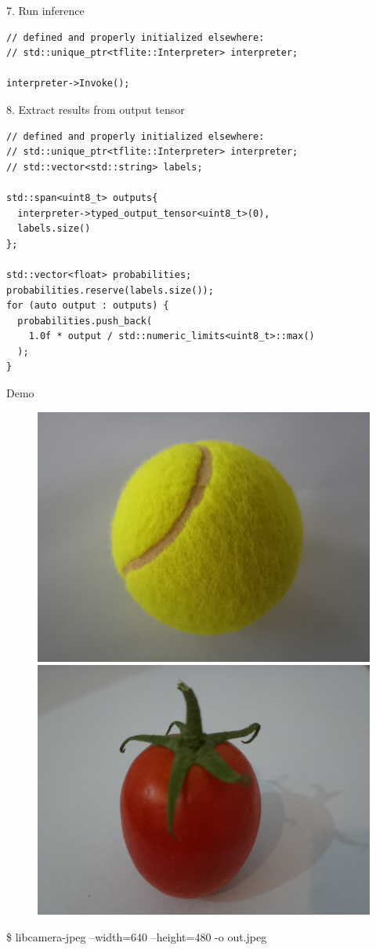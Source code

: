\begin{frame}[fragile]{7. Run inference}
  \lstset{basicstyle=\ttfamily\small, numbers=left, columns=fullflexible}
  \begin{lstlisting}
// defined and properly initialized elsewhere:
// std::unique_ptr<tflite::Interpreter> interpreter;

interpreter->Invoke();
  \end{lstlisting}
\end{frame}

\begin{frame}[fragile]{8. Extract results from output tensor}
  \lstset{basicstyle=\ttfamily\small, numbers=left, columns=fullflexible}
  \begin{lstlisting}
// defined and properly initialized elsewhere:
// std::unique_ptr<tflite::Interpreter> interpreter;
// std::vector<std::string> labels;

std::span<uint8_t> outputs{
  interpreter->typed_output_tensor<uint8_t>(0),
  labels.size()
};

std::vector<float> probabilities;
probabilities.reserve(labels.size());
for (auto output : outputs) {
  probabilities.push_back(
    1.0f * output / std::numeric_limits<uint8_t>::max()
  );
}
  \end{lstlisting}
\end{frame}

\begin{frame}{Demo}
  \begin{figure}
	\includegraphics[width=0.5\linewidth,height=0.5\textheight,keepaspectratio]{../images/tennis_ball_input.jpeg}%
	\includegraphics[width=0.5\linewidth,height=0.5\textheight,keepaspectratio]{../images/tomato.jpeg}
  \end{figure}
  \ttfamily \$ libcamera-jpeg --width=640 --height=480 -o out.jpeg
\end{frame}

